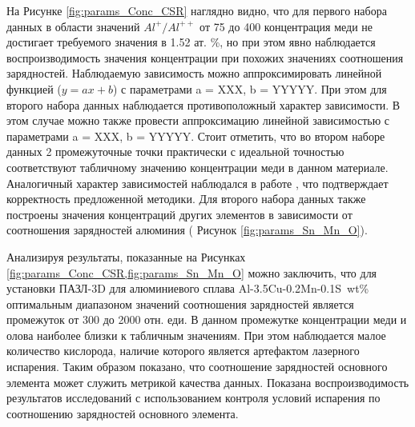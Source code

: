 На Рисунке \cref{fig:params_Conc_CSR} наглядно видно, что для первого набора данных в области значений $Al^{+}/Al^{++}$ от 75 до 400 концентрация меди не достигает требуемого значения в 1.52 ат. \%, но при этом явно наблюдается воспроизводимость значения концентрации при похожих значениях соотношения зарядностей. Наблюдаемую зависимость можно аппроксимировать линейной функцией ($y = ax + b$) с параметрами a = XXX, b = YYYYY. При этом для второго набора данных наблюдается противоположный характер зависимости. В этом случае можно также провести аппроксимацию линейной зависимостью с параметрами a = XXX, b = YYYYY. Стоит отметить, что во втором наборе данных 2 промежуточные точки практически с идеальной точностью соответствуют табличному значению концентрации меди в данном материале. Аналогичный характер зависимостей наблюдался в работе \cite{Mancini14}, что подтверждает корректность предложенной методики. Для второго набора данных также построены значения концентраций других элементов  в зависимости от соотношения зарядностей алюминия ( Рисунок \cref{fig:params_Sn_Mn_O}).


Анализируя результаты, показанные на Рисунках \cref{fig:params_Conc_CSR,fig:params_Sn_Mn_O} можно заключить, что для установки ПАЗЛ-3D для алюминиевого сплава Al-3.5Cu-0.2Mn-0.1S~wt\% оптимальным диапазоном значений соотношения зарядностей является промежуток от 300 до 2000 отн. еди. В данном промежутке концентрации меди и олова наиболее близки к табличным значениям. При этом наблюдается малое количество кислорода, наличие которого является артефактом лазерного испарения. Таким образом показано, что соотношение зарядностей основного элемента может служить метрикой качества данных. Показана воспроизводимость результатов исследований с использованием контроля условий испарения по соотношению зарядностей основного элемента.

